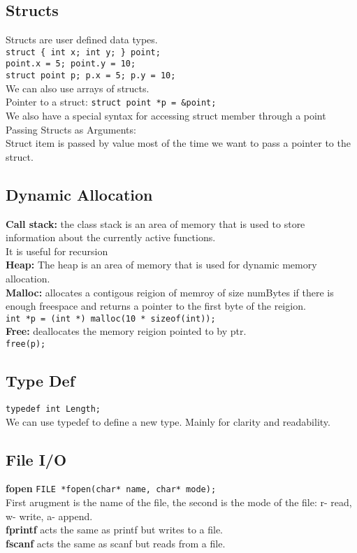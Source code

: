 \documentclass[answers,12pt,addpoints]{exam}
\begin{document}
\subsection{Structs}
Structs are user defined data types. \\
\texttt{struct \{ int x; int y; \} point;} \\
\texttt{point.x = 5; point.y = 10;} \\
\texttt{struct point p; p.x = 5; p.y = 10;} \\
We can also use arrays of structs. \\
Pointer to a struct: \texttt{struct point *p = \&point;} \\
We also have a special syntax for accessing struct member through a point\\
Passing Structs as Arguments: \\
Struct item is passed by value
most of the time we want to pass a pointer to the struct. \\

\subsection{Dynamic Allocation}
\textbf{Call stack:}  the class stack is an area of memory that is used to store information about the currently active functions. \\
It is useful for recursion\\
\textbf{Heap:} The heap is an area of memory that is used for dynamic memory allocation. \\
\textbf{Malloc:} allocates a contigous reigion of memroy of size numBytes if there is enough freespace and returns a pointer to the first byte of the reigion. \\
\texttt{int *p = (int *) malloc(10 * sizeof(int));} \\
\textbf{Free:} deallocates the memory reigion pointed to by ptr. \\
\texttt{free(p);} \\

\subsection{Type Def}
\texttt{typedef int Length;} \\
We can use typedef to define a new type. Mainly for clarity and readability. \\

\subsection{File I/O}
\textbf{fopen}
\texttt{FILE *fopen(char* name, char* mode);} \\
First arugment is the name of the file, the second is the mode of the file: r- read, w- write, a- append. \\
\textbf{fprintf}
acts the same as printf but writes to a file. \\
\textbf{fscanf}
acts the same as scanf but reads from a file. \\
\end{document}
